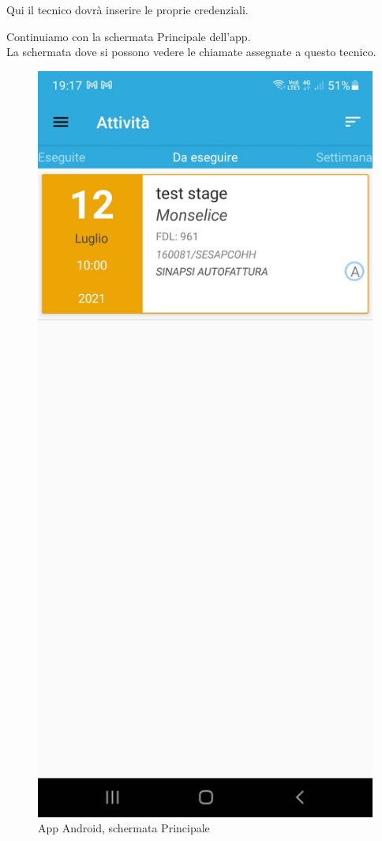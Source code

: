 Qui il tecnico dovrà inserire le proprie credenziali.\\
\newpage
\begin{flushleft}
	Continuiamo con la schermata Principale dell'app.\\
	La schermata dove si possono vedere le chiamate assegnate a questo tecnico.
\end{flushleft}
\begin{figure}[!h] 
	\centering 
	\includegraphics[scale = 0.11]{immagini/app Android/elenco-interventi-android.jpeg} 
	\caption {App Android, schermata Principale}
\end{figure}
